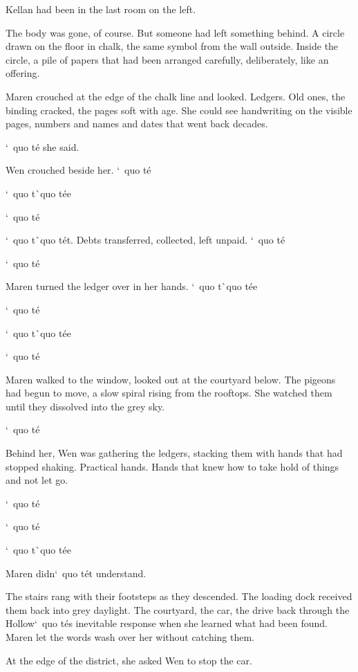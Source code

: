 \documentclass[12pt,letterpaper,openany]{book}
\begin{document}
\par
Kellan had been in the last room on the left.
\par
The body was gone, of course. But someone had left something behind. A circle drawn on the floor in chalk, the same symbol from the wall outside. Inside the circle, a pile of papers that had been arranged carefully, deliberately, like an offering.
\par
Maren crouched at the edge of the chalk line and looked. Ledgers. Old ones, the binding cracked, the pages soft with age. She could see handwriting on the visible pages, numbers and names and dates that went back decades.
\par
`\ quo t\'e{} she said.
\par
Wen crouched beside her. `\ quo t\'e{}
\par
`\ quo t\`\ quo t\'e{}e{}
\par
`\ quo t\'e{}
\par
`\ quo t\`\ quo t\'e{}t. Debts transferred, collected, left unpaid. `\ quo t\'e{}
\par
`\ quo t\'e{}
\par
Maren turned the ledger over in her hands. `\ quo t\`\ quo t\'e{}e{}
\par
`\ quo t\'e{}
\par
`\ quo t\`\ quo t\'e{}e{}
\par
`\ quo t\'e{}
\par
Maren walked to the window, looked out at the courtyard below. The pigeons had begun to move, a slow spiral rising from the rooftops. She watched them until they dissolved into the grey sky.
\par
`\ quo t\'e{}
\par
Behind her, Wen was gathering the ledgers, stacking them with hands that had stopped shaking. Practical hands. Hands that knew how to take hold of things and not let go.
\par
`\ quo t\'e{}
\par
`\ quo t\'e{}
\par
`\ quo t\`\ quo t\'e{}e{}
\par
Maren didn`\ quo t\'e{}t understand.
\par
The stairs rang with their footsteps as they descended. The loading dock received them back into grey daylight. The courtyard, the car, the drive back through the Hollow`\ quo t\'e{}s inevitable response when she learned what had been found. Maren let the words wash over her without catching them.
\par
At the edge of the district, she asked Wen to stop the car.
\end{document}
